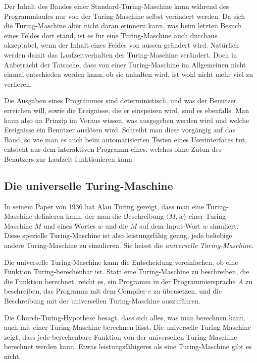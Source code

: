 Der Inhalt des Bandes einer Standard-Turing-Maschine kann während des
Programmlaufes nur von der Turing-Maschine selbst verändert werden.
Da sich die Turing-Maschine aber nicht daran erinnern kann, was beim
letzten Besuch eines Feldes dort stand, ist es für eine Turing-Maschine
auch durchaus akzeptabel, wenn der Inhalt eines Feldes von aussen
geändert wird. Natürlich werden damit das Laufzeitverhalten der
Turing-Maschine verändert. Doch in Anbetracht der
Tatsache, dass von einer Turing-Maschine im Allgemeinen nicht einmal
entschieden werden kann, ob sie anhalten wird, ist wohl nicht mehr
viel zu verlieren.

Die Ausgaben eines Programmes sind deterministisch, und was der Benutzer
erreichen will, sowie die Ereignisse, die er einspeisen wird, sind es ebenfalls.
Man kann also im Prinzip im Voraus wissen, was ausgegeben werden wird
und welche Ereignisse ein Benutzer auslösen wird. Schreibt man diese
vorgängig auf das Band, so wie man es auch beim automatisierten Testen
eines Userinterfaces tut, entsteht aus dem interaktiven Programm eines,
welches ohne Zutun des Benutzers zur Laufzeit funktionieren kann.

\subsection{Die universelle Turing-Maschine}
In seinem Paper von 1936 hat Alan Turing gezeigt, dass man eine
Turing-Maschine definieren kann,
der man die Beschreibung
$\langle M,w\rangle$
einer Turing-Maschine $M$ und eines Wortes $w$
und die $M$ auf dem Input-Wort $w$ simuliert.
Diese spezielle Turing-Maschine ist also leistungsfähig genug, jede
beliebige andere Turing-Maschine zu simulieren. Sie heisst die {\em universelle
Turing-Maschine}.

Die universelle Turing-Maschine kann die Entscheidung vereinfachen,
ob eine Funktion Turing-berechenbar ist. Statt eine Turing-Maschine
zu beschreiben, die die Funktion berechnet, reicht es, ein Programm
in der Programmiersprache $A$ zu beschreiben, das Programm mit dem
Compiler $c$ zu übersetzen, und die Beschreibung mit der universellen
Turing-Maschine auszuführen.

Die Church-Turing-Hypothese besagt, dass sich alles, was man berechnen
kann, auch mit einer Turing-Maschine berechnen lässt. Die universelle
Turing-Maschine zeigt, dass jede berechenbare Funktion von der
universellen Turing-Maschine berechnet werden kann.
Etwas leistungsfähigeres als eine Turing-Maschine gibt es nicht.

